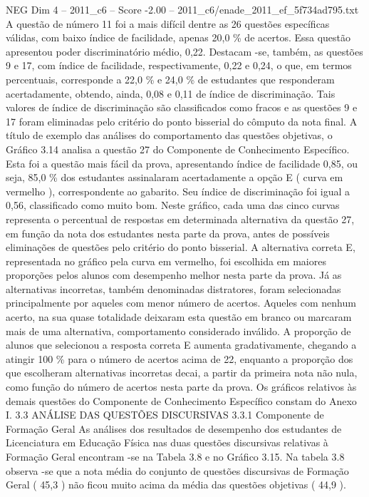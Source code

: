 \begin{textsample}{NEG Dim 4 – 2011\_c6 – Score -2.00 – 2011\_c6/enade\_2011\_ef\_5f734ad795.txt}
A questão de número 11 foi a mais difícil dentre as 26 questões específicas válidas, com baixo índice de facilidade, apenas 20,0 \% de acertos.
Essa questão apresentou poder discriminatório médio, 0,22.
Destacam -se, também, as questões 9 e 17, com índice de facilidade, respectivamente, 0,22 e 0,24, o que, em termos percentuais, corresponde a 22,0 \% e 24,0 \% de estudantes que responderam acertadamente, obtendo, ainda, 0,08 e 0,11 de índice de discriminação.
Tais valores de índice de discriminação são classificados como fracos e as questões 9 e 17 foram eliminadas pelo critério do ponto bisserial do cômputo da nota final.
A título de exemplo das análises do comportamento das questões objetivas, o Gráfico 3.14 analisa a questão 27 do Componente de Conhecimento Específico.
Esta foi a questão mais fácil da prova, apresentando índice de facilidade 0,85, ou seja, 85,0 \% dos estudantes assinalaram acertadamente a opção E ( curva em vermelho ), correspondente ao gabarito.
Seu índice de discriminação foi igual a 0,56, classificado como muito bom.
Neste gráfico, cada uma das cinco curvas representa o percentual de respostas em determinada alternativa da questão 27, em função da nota dos estudantes nesta parte da prova, antes de possíveis eliminações de questões pelo critério do ponto bisserial.
A alternativa correta E, representada no gráfico pela curva em vermelho, foi escolhida em maiores proporções pelos alunos com desempenho melhor nesta parte da prova.
Já as alternativas incorretas, também denominadas distratores, foram selecionadas principalmente por aqueles com menor número de acertos.
Aqueles com nenhum acerto, na sua quase totalidade deixaram esta questão em branco ou marcaram mais de uma alternativa, comportamento considerado inválido.
A proporção de alunos que selecionou a resposta correta E aumenta gradativamente, chegando a atingir 100 \% para o número de acertos acima de 22, enquanto a proporção dos que escolheram alternativas incorretas decai, a partir da primeira nota não nula, como função do número de acertos nesta parte da prova.
Os gráficos relativos às demais questões do Componente de Conhecimento Específico constam do Anexo I. 3.3 ANÁLISE DAS QUESTÕES DISCURSIVAS 3.3.1 Componente de Formação Geral As análises dos resultados de desempenho dos estudantes de Licenciatura em Educação Física nas duas questões discursivas relativas à Formação Geral encontram -se na Tabela 3.8 e no Gráfico 3.15.
Na tabela 3.8 observa -se que a nota média do conjunto de questões discursivas de Formação Geral ( 45,3 ) não ficou muito acima da média das questões objetivas ( 44,9 ).

\end{textsample}
